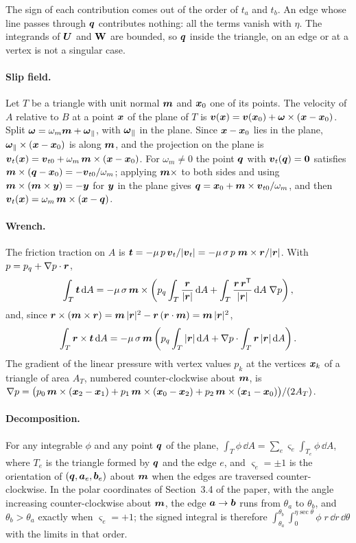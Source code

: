The sign of each contribution comes out of the order of $t_a$ and $t_b$. An edge whose line
passes through $\boldsymbol{q}$ contributes nothing: all the terms vanish with $\eta$. The integrands of
$\boldsymbol{U}$ and $\mathbf{W}$ are bounded, so $\boldsymbol{q}$ inside the triangle, on an edge or at a vertex is
not a singular case.

\paragraph{Slip field.} Let $T$ be a triangle with unit normal $\boldsymbol{m}$ and $\boldsymbol{x}_0$ one of its
points. The velocity of $A$ relative to $B$ at a point $\boldsymbol{x}$ of the plane of $T$ is
$\boldsymbol{v}(\boldsymbol{x}) = \boldsymbol{v}(\boldsymbol{x}_0) + \boldsymbol{\omega}\times(\boldsymbol{x} - \boldsymbol{x}_0)$. Split $\boldsymbol{\omega} = \omega_m\boldsymbol{m} + \boldsymbol{\omega}_\parallel$, with
$\boldsymbol{\omega}_\parallel$ in the plane. Since $\boldsymbol{x} - \boldsymbol{x}_0$ lies in the plane,
$\boldsymbol{\omega}_\parallel\times(\boldsymbol{x}-\boldsymbol{x}_0)$ is along $\boldsymbol{m}$, and the projection on the plane is
$\boldsymbol{v}_t(\boldsymbol{x}) = \boldsymbol{v}_{t0} + \omega_m\,\boldsymbol{m}\times(\boldsymbol{x} - \boldsymbol{x}_0)$. For $\omega_m \ne 0$ the point $\boldsymbol{q}$ with
$\boldsymbol{v}_t(\boldsymbol{q}) = \boldsymbol{0}$ satisfies $\boldsymbol{m}\times(\boldsymbol{q} - \boldsymbol{x}_0) = -\boldsymbol{v}_{t0}/\omega_m$; applying
$\boldsymbol{m}\times$ to both sides and using $\boldsymbol{m}\times(\boldsymbol{m}\times\boldsymbol{y}) = -\boldsymbol{y}$ for $\boldsymbol{y}$ in the
plane gives $\boldsymbol{q} = \boldsymbol{x}_0 + \boldsymbol{m}\times\boldsymbol{v}_{t0}/\omega_m$, and then
$\boldsymbol{v}_t(\boldsymbol{x}) = \omega_m\,\boldsymbol{m}\times(\boldsymbol{x} - \boldsymbol{q})$.

\paragraph{Wrench.} The friction traction on $A$ is
$\boldsymbol{t} = -\mu\,p\,\boldsymbol{v}_t/|\boldsymbol{v}_t| = -\mu\,\sigma\,p\;\boldsymbol{m}\times\boldsymbol{r}/|\boldsymbol{r}|$. With
$p = p_q + \nabla p\cdot\boldsymbol{r}$,
\[
  \int_T \boldsymbol{t}\,\mathrm{d} A
  = -\mu\,\sigma\,\boldsymbol{m}\times\left(p_q\int_T\frac{\boldsymbol{r}}{|\boldsymbol{r}|}\,\mathrm{d} A
     + \int_T\frac{\boldsymbol{r}\,\boldsymbol{r}^{\mathsf T}}{|\boldsymbol{r}|}\,\mathrm{d} A\;\nabla p\right),
\]
and, since $\boldsymbol{r}\times(\boldsymbol{m}\times\boldsymbol{r}) = \boldsymbol{m}\,|\boldsymbol{r}|^2 - \boldsymbol{r}\,(\boldsymbol{r}\cdot\boldsymbol{m}) = \boldsymbol{m}\,|\boldsymbol{r}|^2$,
\[
  \int_T \boldsymbol{r}\times\boldsymbol{t}\,\mathrm{d} A
  = -\mu\,\sigma\,\boldsymbol{m}\left(p_q\int_T|\boldsymbol{r}|\,\mathrm{d} A + \nabla p\cdot\int_T\boldsymbol{r}\,|\boldsymbol{r}|\,\mathrm{d} A\right).
\]
The gradient of the linear pressure with vertex values $p_k$ at the vertices $\boldsymbol{x}_k$ of a
triangle of area $A_T$, numbered counter-clockwise about $\boldsymbol{m}$, is
$\nabla p = \bigl(p_0\,\boldsymbol{m}\times(\boldsymbol{x}_2-\boldsymbol{x}_1) + p_1\,\boldsymbol{m}\times(\boldsymbol{x}_0-\boldsymbol{x}_2)
+ p_2\,\boldsymbol{m}\times(\boldsymbol{x}_1-\boldsymbol{x}_0)\bigr)/(2A_T)$.

\paragraph{Decomposition.} For any integrable $\phi$ and any point $\boldsymbol{q}$ of the plane,
$\int_T\phi\,\dd A = \sum_e \varsigma_e\int_{T_e}\phi\,\dd A$, where $T_e$ is the triangle formed
by $\boldsymbol{q}$ and the edge $e$, and $\varsigma_e = \pm1$ is the orientation of $(\boldsymbol{q}, \boldsymbol{a}_e,
\boldsymbol{b}_e)$ about $\boldsymbol{m}$ when the edges are traversed counter-clockwise. In the polar coordinates
of Section~3.4 of the paper, with the angle increasing counter-clockwise about $\boldsymbol{m}$, the edge
$\boldsymbol{a}\to\boldsymbol{b}$ runs from $\theta_a$ to $\theta_b$, and $\theta_b > \theta_a$ exactly when
$\varsigma_e = +1$; the signed integral is therefore
$\int_{\theta_a}^{\theta_b}\int_0^{\eta\sec\theta}\phi\; r\,\dd r\,\dd\theta$ with the limits in
that order.

